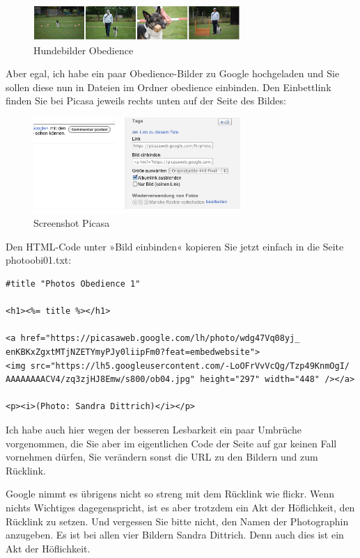 \documentclass[11pt]{report}
\begin{document}
\begin{figure}[h!]
\centering
\includegraphics[width=0.7\textwidth]{./images/hundebilder04.png}
\caption{\label{hundebilder04}Hundebilder Obedience}
\end{figure}
                        
Aber egal, ich habe ein paar Obedience-Bilder zu Google hochgeladen
und Sie sollen diese nun in Dateien im Ordner obedience einbinden. Den
Einbettlink finden Sie bei Picasa jeweils rechts unten auf der Seite
des Bildes:

\begin{figure}[h!]
\centering
\includegraphics[width=0.7\textwidth]{./images/picasa01.png}
\caption{\label{picasa01}Screenshot Picasa}
\end{figure}

Den HTML-Code unter »Bild einbinden« kopieren Sie jetzt einfach in die
Seite photoobi01.txt:


\begin{verbatim}
#title "Photos Obedience 1"

<h1><%= title %></h1>

<a href="https://picasaweb.google.com/lh/photo/wdg47Vq08yj_
enKBKxZgxtMTjNZETYmyPJy0liipFm0?feat=embedwebsite">
<img src="https://lh5.googleusercontent.com/-LoOFrVvVcQg/Tzp49KnmOgI/
AAAAAAAACV4/zq3zjHJ8Emw/s800/ob04.jpg" height="297" width="448" /></a>

<p><i>(Photo: Sandra Dittrich)</i></p>
\end{verbatim}

Ich habe auch hier wegen der besseren Lesbarkeit ein paar Umbrüche
vorgenommen, die Sie aber im eigentlichen Code der Seite auf gar
keinen Fall vornehmen dürfen, Sie verändern sonst die URL zu den
Bildern und zum Rücklink.


Google nimmt es übrigens nicht so streng mit dem Rücklink wie
flickr. Wenn nichts Wichtiges dagegenspricht, ist es aber trotzdem ein
Akt der Höflichkeit, den Rücklink zu setzen. Und vergessen Sie bitte
nicht, den Namen der Photographin anzugeben. Es ist bei allen vier
Bildern Sandra Dittrich. Denn auch dies ist ein Akt der Höflichkeit.
\end{document}
